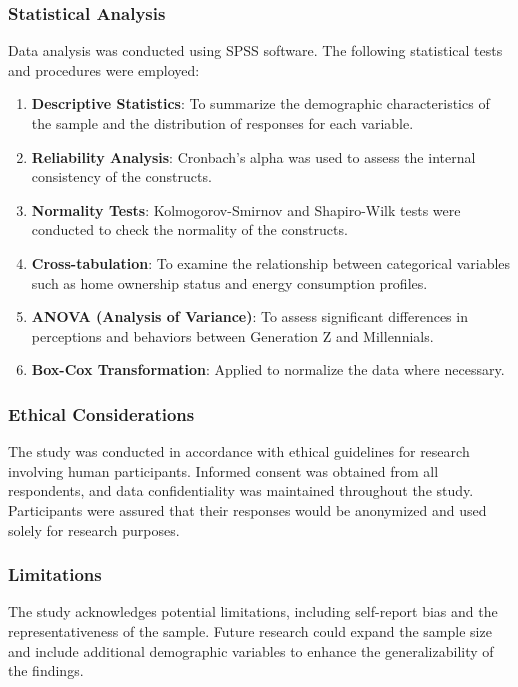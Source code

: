 \documentclass[
  letterpaper,
  DIV=11,
  numbers=noendperiod]{scrartcl}
\providecommand{\tightlist}{%
  \setlength{\itemsep}{0pt}\setlength{\parskip}{0pt}}\usepackage{longtable,booktabs,array}
\begin{document}
\subsubsection{Statistical Analysis}\label{statistical-analysis}

Data analysis was conducted using SPSS software. The following
statistical tests and procedures were employed:

\begin{enumerate}
\def\labelenumi{\arabic{enumi}.}
\tightlist
\item
  \textbf{Descriptive Statistics}: To summarize the demographic
  characteristics of the sample and the distribution of responses for
  each variable.
\item
  \textbf{Reliability Analysis}: Cronbach's alpha was used to assess the
  internal consistency of the constructs.
\item
  \textbf{Normality Tests}: Kolmogorov-Smirnov and Shapiro-Wilk tests
  were conducted to check the normality of the constructs.
\item
  \textbf{Cross-tabulation}: To examine the relationship between
  categorical variables such as home ownership status and energy
  consumption profiles.
\item
  \textbf{ANOVA (Analysis of Variance)}: To assess significant
  differences in perceptions and behaviors between Generation Z and
  Millennials.
\item
  \textbf{Box-Cox Transformation}: Applied to normalize the data where
  necessary.
\end{enumerate}

\subsubsection{Ethical Considerations}\label{ethical-considerations}

The study was conducted in accordance with ethical guidelines for
research involving human participants. Informed consent was obtained
from all respondents, and data confidentiality was maintained throughout
the study. Participants were assured that their responses would be
anonymized and used solely for research purposes.

\subsubsection{Limitations}\label{limitations}

The study acknowledges potential limitations, including self-report bias
and the representativeness of the sample. Future research could expand
the sample size and include additional demographic variables to enhance
the generalizability of the findings.
\end{document}
